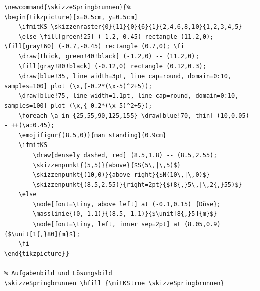\begin{lstlisting}[style=latex]
\newcommand{\skizzeSpringbrunnen}{%
\begin{tikzpicture}[x=0.5cm, y=0.5cm]
	\ifmitKS \skizzenraster{0}{11}{0}{6}{1}{2,4,6,8,10}{1,2,3,4,5}
	\else \fill[green!25] (-1.2,-0.45) rectangle (11.2,0); \fill[gray!60] (-0.7,-0.45) rectangle (0.7,0); \fi
	\draw[thick, green!40!black] (-1.2,0) -- (11.2,0);
	\fill[gray!80!black] (-0.12,0) rectangle (0.12,0.3);
	\draw[blue!35, line width=3pt, line cap=round, domain=0:10, samples=100] plot (\x,{-0.2*(\x-5)^2+5});
	\draw[blue!75, line width=1.1pt, line cap=round, domain=0:10, samples=100] plot (\x,{-0.2*(\x-5)^2+5});
	\foreach \a in {25,55,90,125,155} \draw[blue!70, thin] (10,0.05) -- ++(\a:0.45);
	\emojifigur{(8.5,0)}{man standing}{0.9cm}
	\ifmitKS
		\draw[densely dashed, red] (8.5,1.8) -- (8.5,2.55);
		\skizzenpunkt{(5,5)}{above}{$S(5\,|\,5)$}
		\skizzenpunkt{(10,0)}{above right}{$N(10\,|\,0)$}
		\skizzenpunkt{(8.5,2.55)}{right=2pt}{$(8{,}5\,|\,2{,}55)$}
	\else
		\node[font=\tiny, above left] at (-0.1,0.15) {Düse};
		\masslinie{(0,-1.1)}{(8.5,-1.1)}{$\unit[8{,}5]{m}$}
		\node[font=\tiny, left, inner sep=2pt] at (8.05,0.9) {$\unit[1{,}80]{m}$};
	\fi
\end{tikzpicture}}

% Aufgabenbild und Lösungsbild
\skizzeSpringbrunnen \hfill {\mitKStrue \skizzeSpringbrunnen}
\end{lstlisting}

\newcommand{\skizzeSpringbrunnen}{%
\begin{tikzpicture}[x=0.5cm, y=0.5cm]
	\ifmitKS \skizzenraster{0}{11}{0}{6}{1}{2,4,6,8,10}{1,2,3,4,5}
	\else \fill[green!25] (-1.2,-0.45) rectangle (11.2,0); \fill[gray!60] (-0.7,-0.45) rectangle (0.7,0); \fi
	\draw[thick, green!40!black] (-1.2,0) -- (11.2,0);
	\fill[gray!80!black] (-0.12,0) rectangle (0.12,0.3);
	\draw[blue!35, line width=3pt, line cap=round, domain=0:10, samples=100] plot (\x,{-0.2*(\x-5)^2+5});
	\draw[blue!75, line width=1.1pt, line cap=round, domain=0:10, samples=100] plot (\x,{-0.2*(\x-5)^2+5});
	\foreach \a in {25,55,90,125,155} \draw[blue!70, thin] (10,0.05) -- ++(\a:0.45);
	\emojifigur{(8.5,0)}{man standing}{0.9cm}
	\ifmitKS
		\draw[densely dashed, red] (8.5,1.8) -- (8.5,2.55);
		\skizzenpunkt{(5,5)}{above}{$S(5\,|\,5)$}
		\skizzenpunkt{(10,0)}{above right}{$N(10\,|\,0)$}
		\skizzenpunkt{(8.5,2.55)}{right=2pt}{$(8{,}5\,|\,2{,}55)$}
	\else
		\node[font=\tiny, above left] at (-0.1,0.15) {Düse};
		\masslinie{(0,-1.1)}{(8.5,-1.1)}{$\unit[8{,}5]{m}$}
		\node[font=\tiny, left, inner sep=2pt] at (8.05,0.9) {$\unit[1{,}80]{m}$};
	\fi
\end{tikzpicture}}

